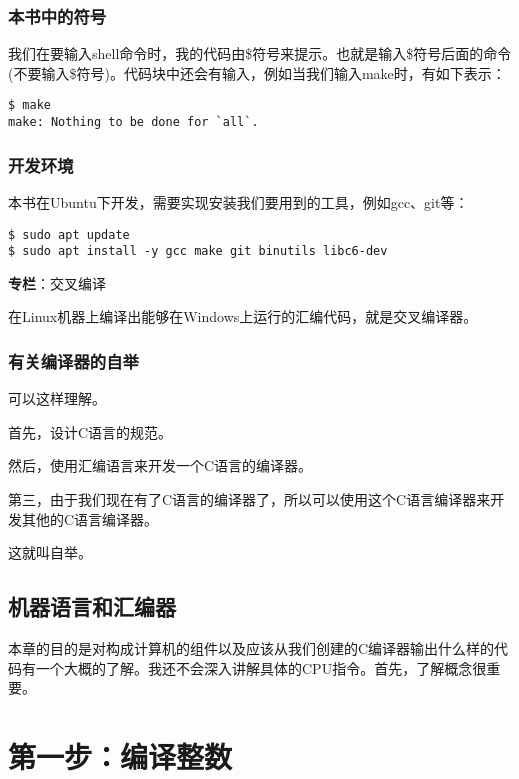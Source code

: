\documentclass[cn,10pt,math=newtx,citestyle=gb7714-2015,bibstyle=gb7714-2015]{elegantbook}
\begin{document}
\subsection{本书中的符号}
    我们在要输入shell命令时，我的代码由\$符号来提示。也就是输入\$符号后面的命令(不要输入\$符号)。代码块中还会有输入，例如当我们输入make时，有如下表示：

\begin{verbatim}
$ make
make: Nothing to be done for `all`.
\end{verbatim}

\subsection{开发环境}

本书在Ubuntu下开发，需要实现安装我们要用到的工具，例如gcc、git等：

\begin{verbatim}
$ sudo apt update
$ sudo apt install -y gcc make git binutils libc6-dev
\end{verbatim}

\begin{tcolorbox}
\textbf{专栏}：交叉编译

在Linux机器上编译出能够在Windows上运行的汇编代码，就是交叉编译器。
\end{tcolorbox}

\subsection{有关编译器的自举}

可以这样理解。

首先，设计C语言的规范。

然后，使用汇编语言来开发一个C语言的编译器。

第三，由于我们现在有了C语言的编译器了，所以可以使用这个C语言编译器来开发其他的C语言编译器。

这就叫自举。

\section{机器语言和汇编器}

本章的目的是对构成计算机的组件以及应该从我们创建的C编译器输出什么样的代码有一个大概的了解。我还不会深入讲解具体的CPU指令。首先，了解概念很重要。




\chapter{第一步：编译整数}
\end{document}
